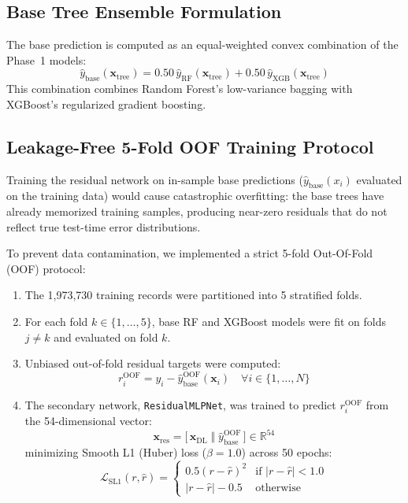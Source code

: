 \documentclass[conference]{IEEEtran}
\begin{document}
\subsection{Base Tree Ensemble Formulation}
The base prediction is computed as an equal-weighted convex combination of the Phase~1 models:
\begin{equation}
  \hat{y}_{\text{base}}(\mathbf{x}_{\text{tree}}) = 0.50\,\hat{y}_{\text{RF}}(\mathbf{x}_{\text{tree}}) + 0.50\,\hat{y}_{\text{XGB}}(\mathbf{x}_{\text{tree}})
  \label{eq:base_tree}
\end{equation}
This combination combines Random Forest's low-variance bagging with XGBoost's regularized gradient boosting.

\subsection{Leakage-Free 5-Fold OOF Training Protocol}
Training the residual network on in-sample base predictions ($\hat{y}_{\text{base}}(x_i)$ evaluated
on the training data) would cause catastrophic overfitting: the base trees have already memorized
training samples, producing near-zero residuals that do not reflect true test-time error distributions.

To prevent data contamination, we implemented a strict 5-fold Out-Of-Fold (OOF) protocol:
\begin{enumerate}
  \item The 1,973,730 training records were partitioned into 5 stratified folds.
  \item For each fold $k \in \{1,\dots,5\}$, base RF and XGBoost models were fit on folds $j \neq k$
        and evaluated on fold $k$.
  \item Unbiased out-of-fold residual targets were computed:
        \begin{equation}
          r_i^{\text{OOF}} = y_i - \hat{y}_{\text{base}}^{\text{OOF}}(\mathbf{x}_i) \quad \forall i \in \{1,\dots,N\}
        \end{equation}
  \item The secondary network, \texttt{ResidualMLPNet}, was trained to predict $r_i^{\text{OOF}}$
        from the 54-dimensional vector:
        \begin{equation}
          \mathbf{x}_{\text{res}} = \big[\,\mathbf{x}_{\text{DL}} \;\Vert\; \hat{y}_{\text{base}}^{\text{OOF}}\,\big] \in \mathbb{R}^{54}
        \end{equation}
        minimizing Smooth L1 (Huber) loss ($\beta = 1.0$) across 50 epochs:
        \begin{equation}
          \mathcal{L}_{\text{SL1}}(r, \hat{r}) =
          \begin{cases}
            0.5(r - \hat{r})^2 & \text{if } |r - \hat{r}| < 1.0 \\
            |r - \hat{r}| - 0.5 & \text{otherwise}
          \end{cases}
        \end{equation}
\end{enumerate}
\end{document}
